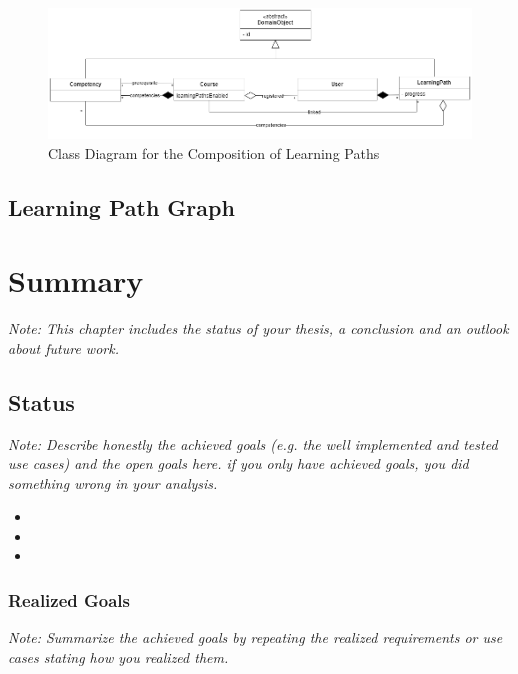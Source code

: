 \documentclass[a4paper,12pt,twoside]{report}
\begin{document}
\begin{figure}[h!]
	\centering
	\includegraphics[width=\linewidth]{figures/LearningPathObjectModel.png}
	\caption{Class Diagram for the Composition of Learning Paths}
	\label{figure:LPOM}
\end{figure}

\section{Learning Path Graph}
\label{section:LearningPathGraph}


\chapter{Summary}

\textit{Note: This chapter includes the status of your thesis, a conclusion and an outlook about future work.}

\section{Status}

\textit{Note: Describe honestly the achieved goals (e.g. the well implemented and tested use cases) and the open goals here. if you only have achieved goals, you did something wrong in your analysis.}

\begin{itemize}
	\item [\Circle]
	\item [\LEFTcircle]
	\item [\CIRCLE]
\end{itemize}

\subsection{Realized Goals}

\textit{Note: Summarize the achieved goals by repeating the realized requirements or use cases stating how you realized them.}
\end{document}
